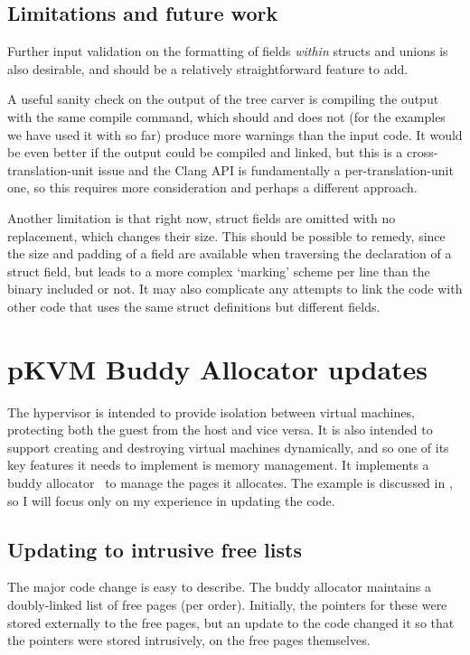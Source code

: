\section{Limitations and future work}

Further input validation on the formatting of fields \emph{within} structs and
unions is also desirable, and should be a relatively straightforward feature to
add.

A useful sanity check on the output of the tree carver is compiling the output
with the same compile command, which should and does not (for the examples we
have used it with so far) produce more warnings than the input code. It would
be even better if the output could be compiled and linked, but this is a
cross-translation-unit issue and the Clang API is fundamentally a
per-translation-unit one, so this requires more consideration and perhaps a
different approach.

Another limitation is that right now, struct fields are omitted with no
replacement, which changes their size. This should be possible to remedy, since
the size and padding of a field are available when traversing the declaration
of a struct field, but leads to a more complex `marking' scheme per line than
the binary included or not. It may also complicate any attempts to link the
code with other code that uses the same struct definitions but different
fields.

\chapter{pKVM Buddy Allocator updates}\label{chap:buddy}

The  hypervisor is intended to provide isolation between virtual
machines, protecting both the guest from the host and vice versa. It is also
intended to support creating and destroying virtual machines dynamically, and
so one of its key features it needs to implement is memory management. It
implements a buddy allocator~ to manage the pages it
allocates. The example is discussed in , so I will
focus only on my experience in updating the code.

\section{Updating to intrusive free lists}

The major code change is easy to describe. The buddy allocator maintains a
doubly-linked list of free pages (per order). Initially, the pointers for these
were stored externally to the free pages, but an update to the code changed it
so that the pointers were stored intrusively, on the free pages themselves.

